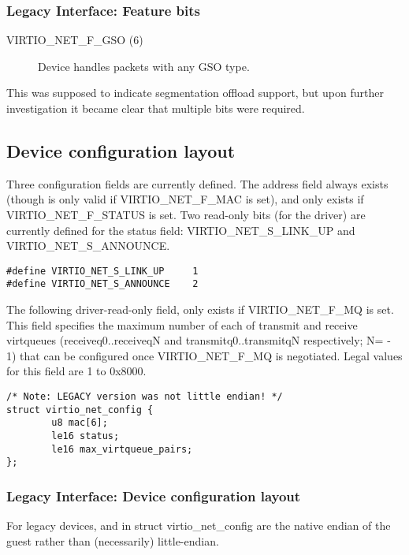 \subsubsection{Legacy Interface: Feature bits}\label{sec:Device Types / Network Device / Feature bits / Legacy Interface: Feature bits}
\begin{description}
\item[VIRTIO_NET_F_GSO (6)] Device handles packets with any GSO type.
\end{description}

This was supposed to indicate segmentation offload support, but
upon further investigation it became clear that multiple bits
were required.

\subsection{Device configuration layout}\label{sec:Device Types / Network Device / Device configuration layout}

Three configuration fields are currently defined. The  address field
always exists (though is only valid if VIRTIO_NET_F_MAC is set), and
 only exists if VIRTIO_NET_F_STATUS is set. Two
read-only bits (for the driver) are currently defined for the status field:
VIRTIO_NET_S_LINK_UP and VIRTIO_NET_S_ANNOUNCE.

\begin{lstlisting}
#define VIRTIO_NET_S_LINK_UP     1
#define VIRTIO_NET_S_ANNOUNCE    2
\end{lstlisting}

The following driver-read-only field,  only exists if
VIRTIO_NET_F_MQ is set. This field specifies the maximum number
of each of transmit and receive virtqueues (receiveq0..receiveqN
and transmitq0..transmitqN respectively;
 N= - 1) that can be configured once VIRTIO_NET_F_MQ
is negotiated.  Legal values for this field are 1 to 0x8000.

\begin{lstlisting}
/* Note: LEGACY version was not little endian! */
struct virtio_net_config {
        u8 mac[6];
        le16 status;
        le16 max_virtqueue_pairs;
};
\end{lstlisting}

\subsubsection{Legacy Interface: Device configuration layout}\label{sec:Device Types / Network Device / Device configuration layout / Legacy Interface: Device configuration layout}
For legacy devices,  and  in struct virtio_net_config are the
native endian of the guest rather than (necessarily) little-endian.


